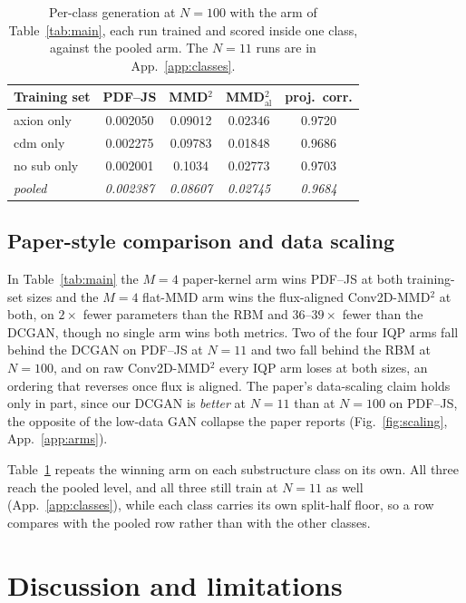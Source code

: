 \documentclass{article}
\begin{document}
\begin{table}[t]
\centering
\caption{Per-class generation at $N{=}100$ with the arm of Table~\ref{tab:main}, each run trained and
scored inside one class, against the pooled arm. The $N{=}11$ runs are in App.~\ref{app:classes}.}
\label{tab:classes}
\scriptsize
\setlength{\tabcolsep}{6pt}
\begin{tabular}{lcccc}
\toprule
Training set & PDF--JS & MMD$^2$ & MMD$^2_{\mathrm{al}}$ & proj.\ corr. \\
\midrule
axion only  & 0.002050 & 0.09012 & 0.02346 & 0.9720 \\
cdm only    & 0.002275 & 0.09783 & 0.01848 & 0.9686 \\
no sub only & 0.002001 & 0.1034  & 0.02773 & 0.9703 \\
\textit{pooled} & \textit{0.002387} & \textit{0.08607} & \textit{0.02745} & \textit{0.9684} \\
\bottomrule
\end{tabular}
\end{table}

\subsection{Paper-style comparison and data scaling}
\label{sec:table}

In Table~\ref{tab:main} the $M{=}4$ paper-kernel arm wins PDF--JS at both training-set sizes and the
$M{=}4$ flat-MMD arm wins the flux-aligned Conv2D-MMD$^2$ at both, on $2\times$ fewer parameters than
the RBM and $36$--$39\times$ fewer than the DCGAN, though no single arm wins both metrics. Two of the
four IQP arms fall behind the DCGAN on PDF--JS at $N{=}11$ and two fall behind the RBM at $N{=}100$,
and on raw Conv2D-MMD$^2$ every IQP arm loses at both sizes, an ordering that reverses once flux is
aligned. The paper's data-scaling claim holds only in part, since our DCGAN is \emph{better} at
$N{=}11$ than at $N{=}100$ on PDF--JS, the opposite of the low-data GAN collapse the paper reports
(Fig.~\ref{fig:scaling}, App.~\ref{app:arms}).

Table~\ref{tab:classes} repeats the winning arm on each substructure class on its own. All three
reach the pooled level, and all three still train at $N{=}11$ as well (App.~\ref{app:classes}), while
each class carries its own split-half floor, so a row compares with the pooled row rather than with
the other classes.

\section{Discussion and limitations}
\label{sec:disc}
\end{document}
